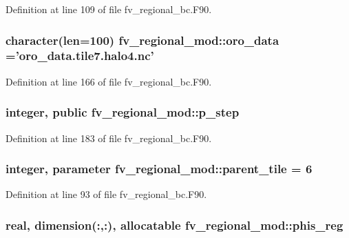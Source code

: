Definition at line 109 of file fv\-\_\-regional\-\_\-bc.\-F90.

\subsubsection[{oro\-\_\-data}]{\setlength{\rightskip}{0pt plus 5cm}character(len=100) fv\-\_\-regional\-\_\-mod\-::oro\-\_\-data ='oro\-\_\-data.\-tile7.\-halo4.\-nc'\hspace{0.3cm}{\ttfamily [private]}}\label{classfv__regional__mod_a97454c0d7b19a08bc2bd65c06cc75fcb}


Definition at line 166 of file fv\-\_\-regional\-\_\-bc.\-F90.

\subsubsection[{p\-\_\-step}]{\setlength{\rightskip}{0pt plus 5cm}integer, public fv\-\_\-regional\-\_\-mod\-::p\-\_\-step}\label{classfv__regional__mod_a829242ae29d3a80d8bf09dbc093cbac0}


Definition at line 183 of file fv\-\_\-regional\-\_\-bc.\-F90.

\subsubsection[{parent\-\_\-tile}]{\setlength{\rightskip}{0pt plus 5cm}integer, parameter fv\-\_\-regional\-\_\-mod\-::parent\-\_\-tile = 6\hspace{0.3cm}{\ttfamily [private]}}\label{classfv__regional__mod_aea80f27ba09a8d5a80ed70efe8a15da3}


Definition at line 93 of file fv\-\_\-regional\-\_\-bc.\-F90.

\subsubsection[{phis\-\_\-reg}]{\setlength{\rightskip}{0pt plus 5cm}real, dimension(\-:,\-:), allocatable fv\-\_\-regional\-\_\-mod\-::phis\-\_\-reg\hspace{0.3cm}{\ttfamily [private]}}\label{classfv__regional__mod_a4360b9bea440884168e896f8c5ce3a4c}


